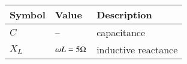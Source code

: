 \begin{tabular}{ | m{1.0cm} | m{1.5cm} |m{2.5cm} |} 
  \hline
 Symbol & Value &Description\\ 
 \hline
$C$& --&  capacitance \\
\hline
$X_L$&$\omega L=5 \ohm$& inductive reactance  \\
\hline
\end{tabular}\\
\label{rajmalt4gate21ee}
\caption{}
